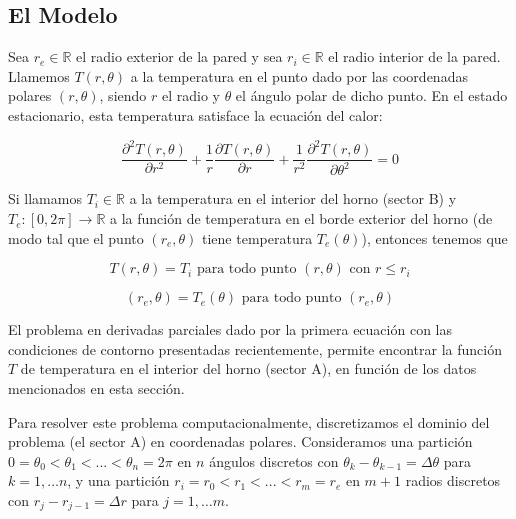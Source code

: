 \documentclass[11pt, a4paper, spanish]{article}
\begin{document}
\begin{appendices}
    \subsection{El Modelo}

      Sea $r_e \in \mathbb{R}$ el radio exterior de la pared y sea $r_i \in \mathbb{R}$ el radio interior de la pared. Llamemos $T(r, \theta)$ a la temperatura en el punto dado por las coordenadas polares $(r, \theta)$, siendo $r$ el radio y $\theta$ el ángulo polar de dicho punto. En el estado estacionario, esta temperatura satisface la ecuación del calor:

      \begin{equation} \label{eq:en1}
        \frac{\partial^2 T(r, \theta)}{\partial r^2} + \frac{1}{r} \frac{\partial T(r, \theta)}{\partial r} + \frac{1}{r^2} \frac{\partial^2 T(r, \theta)}{\partial \theta^2} = 0
      \end{equation}

      Si llamamos $T_i \in \mathbb{R}$ a la temperatura en el interior del horno (sector B) y $T_e : [0, 2\pi] \to \mathbb{R}$ a la función de temperatura en el borde exterior del horno (de modo tal que el punto $(r_e, \theta)$ tiene temperatura $T_e(\theta)$), entonces tenemos que

      \begin{equation} \label{eq:en2}
        T(r, \theta) = T_i \text{ para todo punto } (r, \theta) \text{ con } r \leq r_i
      \end{equation}

      \begin{equation} \label{eq:en3}
        (r_e, \theta) = T_e(\theta) \text{ para todo punto } (r_e, \theta)
      \end{equation}

      El problema en derivadas parciales dado por la primera ecuación con las condiciones de contorno presentadas recientemente, permite encontrar la función $T$ de temperatura en el interior del horno (sector A), en función de los datos mencionados en esta sección.

      Para resolver este problema computacionalmente, discretizamos el dominio del problema (el sector A) en coordenadas polares. Consideramos una partición $0 = \theta_0 < \theta_1 < ... < \theta_n = 2\pi$ en $n$ ángulos discretos con $\theta_k - \theta_{k-1} = \Delta \theta$ para $k = 1, \dots n$, y una partición $r_i = r_0 < r_1 < ... < r_m = r_e$ en $m + 1$ radios discretos con $r_j - r_{j-1} = \Delta r$ para $j = 1, \dots m$.


\end{appendices}
\end{document}
